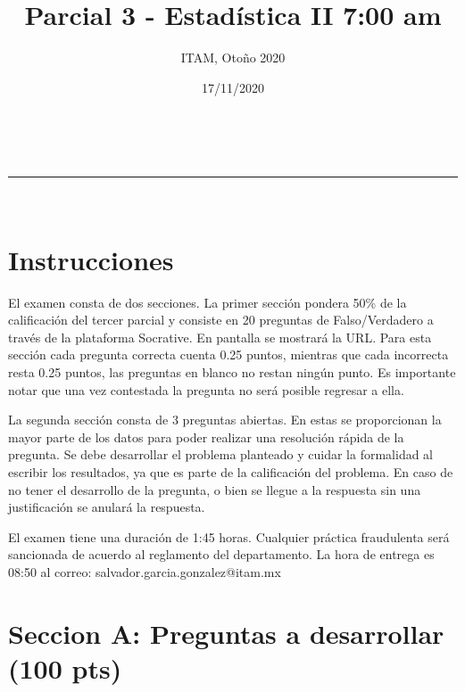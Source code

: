 \documentclass[addpoints]{exam}
\makeatletter
\newcommand{\linia}{\rule{\linewidth}{0.5pt}}
\theoremstyle{mytheor}
\renewcommand{\maketitle}{
    \begin{center}
    \vspace{2ex}
    {\huge \textsc{\@title}}
    \vspace{1ex}
    \\
    \linia\\
    \@author \hfill \@date
    \vspace{4ex}
    \end{center}
  }
\makeatother
\begin{document}
  
  \title{Parcial 3 - Estadística II 7:00 am}
  
  \author{ITAM, Otoño 2020}
  
  \date{17/11/2020}
  
  \maketitle
  
  \section*{Instrucciones}
  
El examen consta de dos secciones. La primer sección pondera 50\% de la calificación del tercer parcial y consiste en 20 preguntas de Falso/Verdadero a través de la plataforma Socrative. En pantalla se mostrará la URL. Para esta sección cada pregunta correcta cuenta 0.25 puntos, mientras que cada incorrecta resta 0.25 puntos, las preguntas en blanco no restan ningún punto. Es importante notar que una vez contestada la pregunta no será posible regresar a ella. 
 
 \vspace{10pt}
 
La segunda sección consta de 3 preguntas abiertas. En estas se proporcionan la mayor parte de los datos para poder realizar una resolución rápida de la pregunta. Se debe desarrollar el problema planteado y cuidar la formalidad al escribir los resultados, ya que es parte de la calificación del problema. En caso de no tener el desarrollo de la pregunta, o bien se llegue a la respuesta sin una justificación se anulará la respuesta. 

\vspace{10pt}
  
El examen tiene una duración de 1:45 horas. Cualquier práctica fraudulenta será sancionada de acuerdo al reglamento del departamento. La hora de entrega es 08:50 al correo: salvador.garcia.gonzalez@itam.mx

\section*{Seccion A: Preguntas a desarrollar (100 pts)}
  
\end{document}
